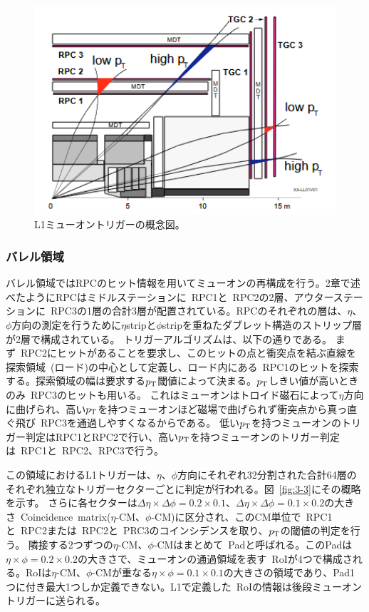 \begin{figure}[h]
  \centering
  \includegraphics[clip, width=13cm]{fig/3/muon_trigger_overview.png}
  \caption{L1ミューオントリガーの概念図\cite{article:barrelSystem}。}
  \label{fig:3-2}
\end{figure}

\subsubsection{バレル領域}
バレル領域ではRPCのヒット情報を用いてミューオンの再構成を行う。2章で述べたようにRPCはミドルステーションに~RPC1と~RPC2の2層、アウターステーションに~RPC3の1層の合計3層が配置されている。RPCのそれぞれの層は、$\eta$、$\phi$方向の測定を行うために$\eta$stripと$\phi$stripを重ねたダブレット構造のストリップ層が2層で構成されている。
トリガーアルゴリズムは、以下の通りである。
まず~RPC2にヒットがあることを要求し、このヒットの点と衝突点を結ぶ直線を探索領域~(ロード)の中心として定義し、ロード内にある~RPC1のヒットを探索する。探索領域の幅は要求する$p_\mathrm{T}$閾値によって決まる。$p_\mathrm{T}$しきい値が高いときのみ~RPC3のヒットも用いる。
これはミューオンはトロイド磁石によって$\eta$方向に曲げられ、高い$p_\mathrm{T}$を持つミューオンほど磁場で曲げられず衝突点から真っ直ぐ飛び~RPC3を通過しやすくなるからである。
低い$p_\mathrm{T}$を持つミューオンのトリガー判定はRPC1とRPC2で行い、高い$p_\mathrm{T}$を持つミューオンのトリガー判定は~RPC1と~RPC2、RPC3で行う。

この領域におけるL1トリガーは、$\eta$、$\phi$方向にそれぞれ32分割された合計64層のそれぞれ独立なトリガーセクターごとに判定が行われる。図~\ref{fig:3-3}にその概略を示す。
さらに各セクターは$\Delta\eta\times\Delta\phi=0.2\times0.1$、$\Delta\eta\times\Delta\phi=0.1\times0.2$の大きさ~Coincidence~matrix($\eta$-CM、$\phi$-CM)に区分され、このCM単位で~RPC1と~RPC2または~RPC2と~PRC3のコインシデンスを取り、$p_\mathrm{T}$の閾値の判定を行う。
隣接する2つずつの$\eta$-CM、$\phi$-CMはまとめて~Padと呼ばれる。このPadは$\eta\times\phi=0.2\times0.2$の大きさで、ミューオンの通過領域を表す~RoIが4つで構成される。RoIは$\eta$-CM、$\phi$-CMが重なる$\eta\times\phi=0.1\times0.1$の大きさの領域であり、Pad1つに付き最大1つしか定義できない。L1で定義した~RoIの情報は後段ミューオントリガーに送られる。


